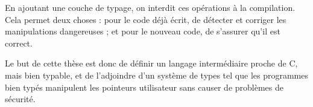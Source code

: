 En ajoutant une couche de typage, on interdit ces opérations à la compilation.
Cela permet deux choses : pour le code déjà écrit, de détecter et corriger les
manipulations dangereuses ; et pour le nouveau code, de s'assurer qu'il est
correct.

Le but de cette thèse est donc de définir un langage intermédiaire proche de C,
mais bien typable, et de l'adjoindre d'un système de types tel que les
programmes bien typés manipulent les pointeurs utilisateur sans causer de
problèmes de sécurité.

